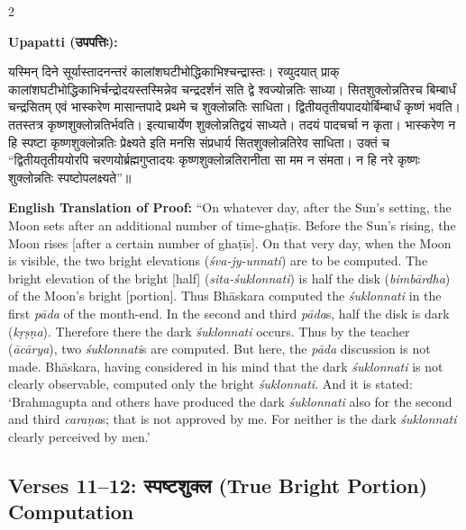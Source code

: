 \documentclass[11pt,a4paper]{article}
\newcommand{\dev}[1]{{\devanagarifont #1}}
\newenvironment{sanskritverse}{%
  \begin{center}\begin{minipage}{0.95\textwidth}
  \setlength{\leftskip}{1em}
  \setlength{\rightskip}{1em}
  \dev
}{\end{minipage}\end{center}}
\begin{document}
\begin{paracol}{2}

\noindent\textbf{Upapatti (\dev{उपपत्तिः}):}
\begin{sanskritverse}
यस्मिन् दिने सूर्यास्तादनन्तरं कालांशघटीभोद्धिकाभिश्चन्द्रास्तः। रव्युदयात् प्राक्
कालांशघटीभोद्धिकाभिर्चन्द्रोदयस्तस्मिन्नेव चन्द्रदर्शनं सति द्वे श्वज्योन्नतिः साध्या।
सितशुक्लोन्नतिरच बिम्बार्धं चन्द्रसितम् एवं भास्करेण मासान्तपादे प्रथमे च
शुक्लोन्नतिः साधिता। द्वितीयतृतीयपादयोर्बिम्बार्धं कृष्णं भवति। ततस्तत्र
कृष्णशुक्लोन्नतिर्भवति। इत्याचार्येण शुक्लोन्नतिद्वयं साध्यते। तदयं पादचर्चा न
कृता। भास्करेण न हि स्पष्टा कृष्णशुक्लोन्नतिः प्रेक्ष्यते इति मनसि संप्रधार्य
सितशुक्लोन्नतिरेव साधिता। उक्तं च ``द्वितीयतृतीययोरपि चरणयोर्ब्रह्मगुप्तादयः कृष्णशुक्लोन्नतिरानीता सा मम न संमता। न हि नरे कृष्णः शुक्लोन्नतिः स्पष्टोपलक्ष्यते''॥
\end{sanskritverse}

\switchcolumn

\textbf{English Translation of Proof:} ``On whatever day, after the Sun's setting, the Moon sets after an additional number of time-ghaṭīs. Before the Sun's rising, the Moon rises [after a certain number of ghaṭīs]. On that very day, when the Moon is visible, the two bright elevations (\textit{śva-jy-unnati}) are to be computed. The bright elevation of the bright [half] (\textit{sita-śuklonnati}) is half the disk (\textit{bimbārdha}) of the Moon's bright [portion]. Thus Bhāskara computed the \textit{śuklonnati} in the first \textit{pāda} of the month-end. In the second and third \textit{pāda}s, half the disk is dark (\textit{kṛṣṇa}). Therefore there the dark \textit{śuklonnati} occurs. Thus by the teacher (\textit{ācārya}), two \textit{śuklonnati}s are computed. But here, the \textit{pāda} discussion is not made. Bhāskara, having considered in his mind that the dark \textit{śuklonnati} is not clearly observable, computed only the bright \textit{śuklonnati}. And it is stated: `Brahmagupta and others have produced the dark \textit{śuklonnati} also for the second and third \textit{caraṇa}s; that is not approved by me. For neither is the dark \textit{śuklonnati} clearly perceived by men.'

\end{paracol}

\subsection{Verses 11--12: {\devanagarifont स्पष्टशुक्ल} (True Bright Portion) Computation}
\end{document}
